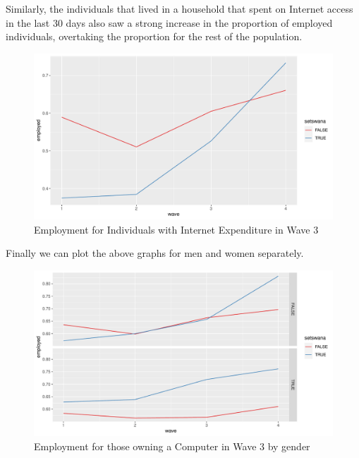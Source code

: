 \documentclass[a4paper,british]{article}\usepackage[]{graphicx}\usepackage[]{xcolor}
\makeatletter
\def\maxwidth{ %
  \ifdim\Gin@nat@width>\linewidth
    \linewidth
  \else
    \Gin@nat@width
  \fi
}
\newenvironment{knitrout}{}{} %
\makeatother
\begin{document}
Similarly, the individuals that lived in a household that spent on
Internet access in the last 30 days also saw a strong increase in
the proportion of employed individuals, overtaking the proportion
for the rest of the population.

\begin{figure}[H]
\caption{Employment for Individuals with Internet Expenditure in Wave 3}

\begin{knitrout}
\color{fgcolor}
\includegraphics[width=\maxwidth]{../misc/latex-employment_int_exp-1} 
\end{knitrout}
\end{figure}

Finally we can plot the above graphs for men and women separately.

\begin{figure}[H]
\caption{Employment for those owning a Computer in Wave 3 by gender}

\begin{knitrout}
\color{fgcolor}
\includegraphics[width=\maxwidth]{../misc/latex-gender_employment_own_computer-1} 
\end{knitrout}
\end{figure}
\end{document}
